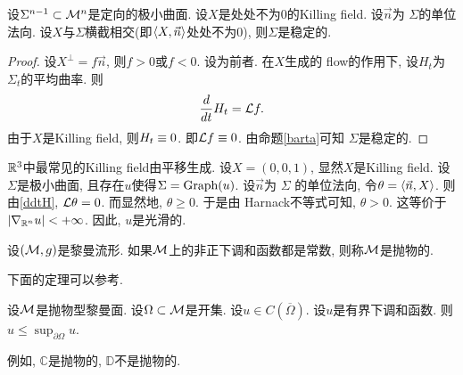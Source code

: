 \begin{proposition}
    设$\Sigma^{n-1} \subset {\mathcal{M}}^n$是定向的极小曲面. 设$X$是处处不为$0$的Killing field. 设$\vec{n}$为 $\Sigma$的单位法向. 设$X$与$\Sigma$横截相交(即${\left < X, \vec{n} \right >}$处处不为$0$), 则$\Sigma$是稳定的.
\end{proposition}
\begin{proof}
    设$X^\perp = f\vec{n}$, 则$f>0$或$f<0$. 设为前者. 在$X$生成的 flow的作用下, 设$H_t$为$\Sigma_t$的平均曲率. 则
    \begin{equation} \label{ddtH}
        \frac{d}{dt} H_t =\mathcal{L} f.
    \end{equation}
    由于$X$是Killing field, 则$H_t \equiv 0$. 即$\mathcal{L} f\equiv 0$. 由命题\eqref{barta}可知 $\Sigma$是稳定的.
\end{proof}
$\mathbb{R}^3$中最常见的Killing field由平移生成. 设$X=(0,0,1)$, 显然$X$是Killing field. 设$\Sigma$是极小曲面, 且存在$u$使得$\Sigma = \text{Graph}(u)$. 设$\vec{n}$为 $\Sigma$ 的单位法向, 令$\theta = {\left < \vec{n}, X \right >}$. 则由\eqref{ddtH}, $\mathcal{L} \theta =0$. 而显然地, $\theta \ge 0$. 于是由 Harnack不等式可知, $\theta >0$. 这等价于$\left | \nabla_{\mathbb{R}^n} u \right | < + \infty$. 因此, $u$是光滑的.
\begin{definition}
    设$({\mathcal{M}},g)$是黎曼流形. 如果${\mathcal{M}}$上的非正下调和函数都是常数, 则称${\mathcal{M}}$是抛物的.
\end{definition}
下面的定理可以参考\cite[p.179]{Kra}.
\begin{theorem}
    设${\mathcal{M}}$是抛物型黎曼面. 设$\Omega \subset {\mathcal{M}}$是开集. 设$u \in C(\overline{\Omega})$. 设$u$是有界下调和函数. 则$u \le \sup_{\partial \Omega}u$.
\end{theorem}
例如, $\mathbb{C}$是抛物的, $\mathbb{D}$不是抛物的.
